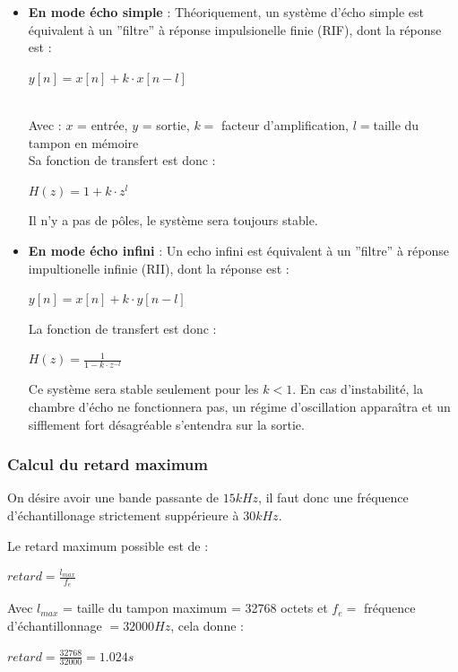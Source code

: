 \documentclass{article}
\begin{document}
\begin{itemize}
\item \textbf{En mode écho simple} : Théoriquement, un système d'écho simple est équivalent à un ''filtre'' à réponse impulsionelle finie (RIF), dont la réponse est :
\begin{center}$y[n] = x[n] + k \cdot x[n-l]$ \end{center}\textbf{}\\
Avec : $x$ = entrée, $y$ = sortie, $k = $ facteur d'amplification, $l = $taille du tampon en mémoire\\

Sa fonction de transfert est donc :
\begin{center}$H(z) = 1 + k \cdot z^l$\end{center}

Il n'y a pas de pôles, le système sera toujours stable.

\item \textbf{En mode écho infini} : Un echo infini est équivalent à un ''filtre'' à réponse impultionelle infinie (RII), dont la réponse est :
\begin{center}$y[n] = x[n] + k \cdot y[n-l]$\end{center}

La fonction de transfert est donc :
\begin{center}$H(z) = \frac{1}{1 - k \cdot z^{-l}}$\end{center}
Ce système sera stable seulement pour les $k<1$. En cas d'instabilité, la chambre d'écho ne fonctionnera pas, un régime d'oscillation apparaîtra et un sifflement fort désagréable s'entendra sur la sortie.
\end{itemize}

\subsubsection{Calcul du retard maximum}
On désire avoir une bande passante de $15 kHz$, il faut donc une fréquence d'échantillonage strictement suppérieure à $30 kHz$.

Le retard maximum possible est de :
\begin{center}$retard = \frac{l_{max}}{f_e}$\end{center}
Avec $l_{max}$ = taille du tampon maximum = 32768 octets et $f_e = $ fréquence d'échantillonnage $= 32000 Hz$, cela donne :
\begin{center}$retard = \frac{32768}{32000} = 1.024 s$\textbf{}\end{center}
\end{document}
